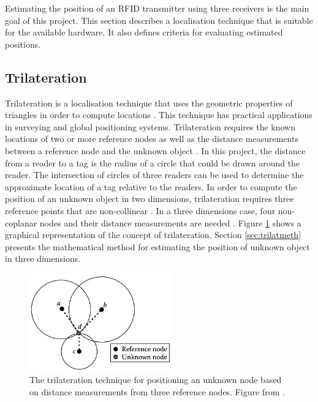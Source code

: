 Estimating the position of an RFID transmitter using three receivers is the main goal of this project. This section describes a localisation technique that is suitable for the available hardware. It also defines criteria for evaluating estimated positions. 

\subsection{Trilateration}
\label{sec:trilatback}

Trilateration is a localisation technique that uses the geometric properties of triangles in order to compute locations \cite{Hightower2001c}. This technique has practical applications in surveying and global positioning systems. Trilateration requires the known locations of two or more reference nodes as well as the distance measurements between a reference node and the unknown object \cite[p. 280]{Zhang2009}. In this project, the distance from a reader to a tag is the radius of a circle that could be drawn around the reader. The intersection of circles of three readers can be used to determine the approximate location of a tag relative to the readers. In order to compute the position of an unknown object in two dimensions, trilateration requires three reference points that are non-collinear \cite{Zhang2009}. In a three dimensions case, four non-coplanar nodes and their distance measurements are needed \cite{Hightower2001c}. Figure \ref{fig:trilat} shows  a graphical representation of the concept of trilateration. Section \ref{sec:trilatmeth} presents the mathematical method for estimating the position of unknown object in three dimensions. 

\begin{figure}[h]
	\begin{center}
		\includegraphics[width=0.55\textwidth]{figures/trilat}
		\caption{The trilateration technique for positioning an unknown node based on distance measurements from three reference nodes. Figure from \cite[p. 281]{Zhang2009}.}
		\label{fig:trilat}
	\end{center}
\end{figure}


